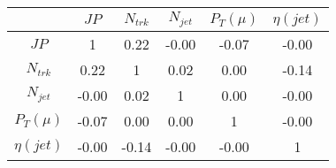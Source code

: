 \begin{tabular}{|c|c|c|c|c|c|} 
\hline
 & $JP$ & $N_{trk}$ & $N_{jet}$ & $P_{T} (\mu)$ & $\eta (jet)$ \\ \hline
$JP$ & 1 & 0.22 & -0.00 & -0.07 & -0.00 \\
$N_{trk}$ & 0.22 & 1 & 0.02 & 0.00 & -0.14 \\
$N_{jet}$ & -0.00 & 0.02 & 1 & 0.00 & -0.00 \\
$P_{T} (\mu)$ & -0.07 & 0.00 & 0.00 & 1 & -0.00 \\
$\eta (jet)$ & -0.00 & -0.14 & -0.00 & -0.00 & 1 \\
\hline 
\end{tabular} 


